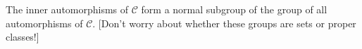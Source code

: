 The inner automorphisms of $\mathcal{C}$ form a normal subgroup of the
group of all automorphisms of $\mathcal{C}$. [Don't worry about whether
these groups are sets or proper classes!]
